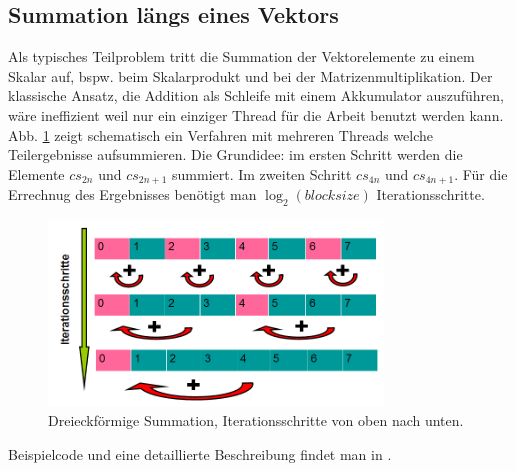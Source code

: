 


\subsection{Summation längs eines Vektors}

Als typisches Teilproblem tritt die Summation der Vektorelemente zu
einem Skalar auf, bspw. beim Skalarprodukt und bei der Matrizenmultiplikation.
Der klassische Ansatz, die Addition als Schleife mit einem Akkumulator
auszuführen, wäre ineffizient weil nur ein einziger Thread für die
Arbeit benutzt werden kann.
Abb. \ref{Dreieck} zeigt schematisch ein Verfahren mit mehreren Threads
welche Teilergebnisse aufsummieren.
Die Grundidee: im ersten Schritt werden die Elemente
$cs_{2n}$ und $cs_{2n+1}$ summiert.
Im zweiten Schritt $cs_{4n}$ und $cs_{4n+1}$. Für die Errechnug
des Ergebnisses benötigt man $ \log_2(blocksize)$ Iterationsschritte.

\begin{figure}[htbp]
\includegraphics[width=3.5in]{../xby/pic//dreieck}
\caption{\label{Dreieck}Dreieckförmige Summation, Iterationsschritte von oben nach unten.}
\end{figure}

Beispielcode und eine detaillierte Beschreibung findet man in \cite{reduction}.

%

